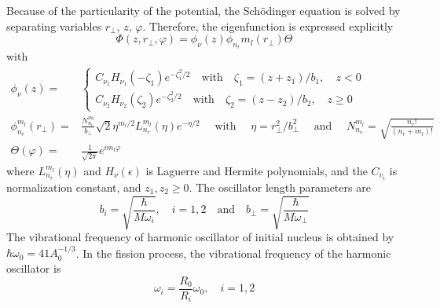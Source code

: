 Because of the particularity of the potential, the Sch{\"o}dinger equation is solved by separating variables $r_\perp$, $z$, $\varphi$. Therefore, the eigenfunction is expressed explicitly
\begin{equation}
\Phi(z, r_\perp, \varphi) = \phi_\nu(z)\phi_{n_r}{m_l}(r_\perp)\Theta \label{tc_sep_var} 
\end{equation}
with
\begin{align}
\phi_{\nu}(z)=&\left\{
  \begin{array}{l}
    C_{\nu_{1}} H_{\nu_{1}}\left(-\zeta_{1}\right) e^{-\zeta_{1}^{2} / 2} \quad \text{with} \quad \zeta_{1}=\left(z+z_{1}\right) / b_{1}, \quad z<0 \\
    C_{\nu_{2}} H_{\nu_{2}}\left(\zeta_{2}\right) e^{-\zeta_{2}^{2} / 2} \quad \text{with} \quad \zeta_{2}=\left(z-z_{2}\right) / b_{2}, \quad z \geq 0
\end{array}\right.  \\
\phi_{n_{r}}^{m_{l}}\left(r_{\perp}\right)=&\frac{N_{n_{r}}^{m_{l}}}{b_{\perp}} \sqrt{2} \eta^{m_{l} / 2} L_{n_{r}}^{m_{l}}(\eta) e^{-\eta / 2} \quad \text { with } \quad \eta=r_{\perp}^{2} / b_{\perp}^{2} \quad \text { and } \quad N_{n_{r}}^{m_{l}}=\sqrt{\frac{n_{r} !}{\left(n_{r}+m_{l}\right) !}}\\
\Theta(\varphi)=&\frac{1}{\sqrt{2 \pi}} e^{i m_{l} \varphi}
\end{align}
where $L_{n_r}^{m_l}(\eta)$ and $H_\nu(\epsilon)$ is Laguerre and Hermite polynomials, and the $C_{v_i}$ is normalization constant, and $z_1, z_2 \geqslant 0$. The oscillator length parameters are
\begin{equation}
b_i = \sqrt{\frac{\hbar}{M\omega_i}},\quad i = 1,2 \quad \text{and} \quad
b_\perp = \sqrt{\frac{\hbar}{M\omega_\perp}}
\end{equation}
The vibrational frequency of harmonic oscillator of initial nucleus is obtained by $\hbar\omega_0 = 41 A_0^{-1/3}$. In the fission process, the vibrational frequency of the harmonic oscillator is
\begin{equation}
\omega_i = \frac{R_0}{R_i}\omega_0, \quad i = 1, 2
\end{equation}

